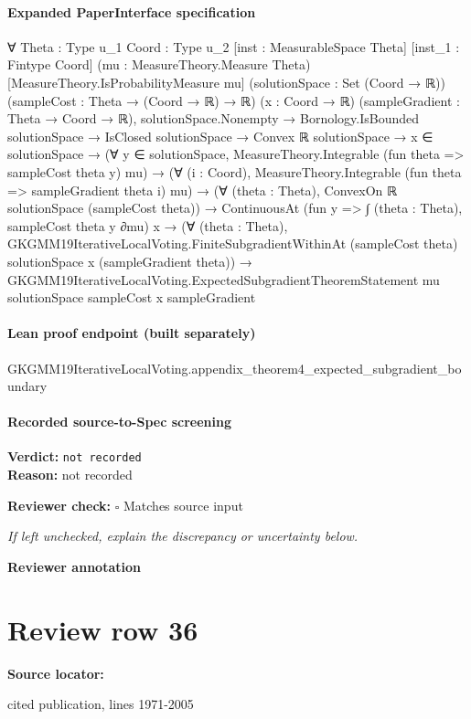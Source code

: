 \documentclass[10pt]{article}
\newcommand{\reviewerbox}{%
  \par\noindent\fbox{\parbox{0.96\linewidth}{\rule{0pt}{0.38in}}}\par
}
\newcommand{\reviewmatch}[1]{%
  \par\noindent\textbf{Reviewer check:} $\square$\; #1\par
  \noindent\emph{If left unchecked, explain the discrepancy or uncertainty below.}\par
}
\begin{document}
\paragraph{Expanded PaperInterface specification}
\begin{ReviewVerbatim}
∀ {Theta : Type u_1} {Coord : Type u_2} [inst : MeasurableSpace Theta] [inst_1 : Fintype Coord]
  (mu : MeasureTheory.Measure Theta) [MeasureTheory.IsProbabilityMeasure mu] (solutionSpace : Set (Coord → ℝ))
  (sampleCost : Theta → (Coord → ℝ) → ℝ) (x : Coord → ℝ) (sampleGradient : Theta → Coord → ℝ),
  solutionSpace.Nonempty →
    Bornology.IsBounded solutionSpace →
      IsClosed solutionSpace →
        Convex ℝ solutionSpace →
          x ∈ solutionSpace →
            (∀ y ∈ solutionSpace, MeasureTheory.Integrable (fun theta => sampleCost theta y) mu) →
              (∀ (i : Coord), MeasureTheory.Integrable (fun theta => sampleGradient theta i) mu) →
                (∀ (theta : Theta), ConvexOn ℝ solutionSpace (sampleCost theta)) →
                  ContinuousAt (fun y => ∫ (theta : Theta), sampleCost theta y ∂mu) x →
                    (∀ (theta : Theta),
                        GKGMM19IterativeLocalVoting.FiniteSubgradientWithinAt (sampleCost theta) solutionSpace x
                          (sampleGradient theta)) →
                      GKGMM19IterativeLocalVoting.ExpectedSubgradientTheoremStatement mu solutionSpace sampleCost x
                        sampleGradient
\end{ReviewVerbatim}

\paragraph{Lean proof endpoint (built separately)}\begin{ReviewVerbatim}
GKGMM19IterativeLocalVoting.appendix_theorem4_expected_subgradient_boundary
\end{ReviewVerbatim}

\paragraph{Recorded source-to-Spec screening}
\textbf{Verdict:} \texttt{not recorded}
\\
\textbf{Reason:} not recorded
\reviewmatch{Matches source input}
\noindent\textbf{Reviewer annotation}\par
\reviewerbox
\clearpage
\hypertarget{source-claim-0f5dabcd51f758b4}{}
\section*{Review row 36}
\textbf{Source locator:} {\footnotesize\raggedright cited publication, lines 1971-\allowbreak{}2005\par}
\end{document}

